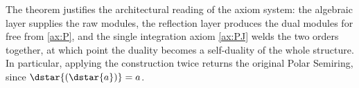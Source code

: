 \begin{remark}
The theorem justifies the architectural reading of the axiom system: the
algebraic layer supplies the raw modules, the reflection layer produces the
dual modules for free from \eqref{ax:P}, and the single integration axiom
\eqref{ax:PJ} welds the two orders together, at which point the duality
becomes a self-duality of the whole structure. In particular, applying the
construction twice returns the original Polar Semiring, since
$\dstar{(\dstar{a})} = a$.
\end{remark}
